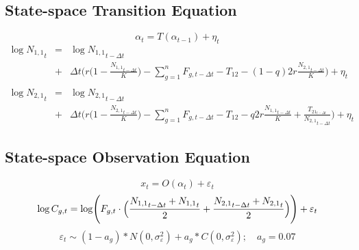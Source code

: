 \documentclass[a4paper,KOMA,landscape,titlepage]{powersem}
\newcommand\None{{N_{1,1}}}
\newcommand\Ntwo{{N_{2,1}}}
\begin{document}
\begin{slide}\section{State-space Transition Equation}
\begin{center}
\begin{equation}
\alpha_t=T(\alpha_{t-1}) + \eta_t
\end{equation}
\vspace{2ex}
\begin{eqnarray}
\label{eqn:finitecoupledlogschaefer}
\log \None_t &=& \log \None_{t-\Delta t}\nonumber\\ 
             &+&\Delta t\bigg(r\Big(1-\frac{\None_{t-\Delta t}}{K}\Big)
-\sum_{g=1}^n F_{g,t-\Delta t} - T_{12} - (1-q)2r\frac{\Ntwo_{t-\Delta
t}}{K}\bigg)+\eta_t\nonumber\\
\\ \log \Ntwo_t &=& \log \Ntwo_{t-\Delta t}\nonumber\\
             &+&\Delta t\bigg(r\Big(1-\frac{\Ntwo_{t-\Delta t}}{K}\Big)
-\sum_{g=1}^n F_{g,t-\Delta t} - T_{12} - q2r\frac{\None_{t-\Delta t}}{K}
     +\frac{T_{{21}_{t-\Delta t}}}{\Ntwo_{t-\Delta t}}\bigg)+\eta_t\nonumber
\end{eqnarray}
\end{center}
\end{slide}

\begin{slide}\section{State-space Observation Equation}
\begin{center}
\begin{equation}
x_t = O(\alpha_t) + \varepsilon_t
\end{equation}
\vspace{2ex}
\begin{equation}
\log C_{g,t} = \log \Biggl(F_{g,t}\cdot\Bigl(\frac{\None_{t-\Delta t}+\None_t}{2}
                           +\frac{\Ntwo_{t-\Delta
t}+\Ntwo_t}{2}\Bigr)\Biggr) + \varepsilon_t
\label{eqn:obs}
\end{equation}
\begin{equation}
\varepsilon_t \sim
(1-a_g)*N(0,\sigma^2_\varepsilon)+a_g*C(0,\sigma^2_\varepsilon);\quad a_g =
0.07
\end{equation}
\end{center}
\end{slide}
\end{document}
